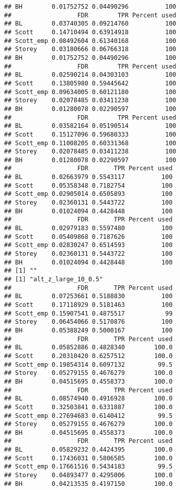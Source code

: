 \documentclass{article}\usepackage[]{graphicx}\usepackage[]{color}
\makeatletter
\newenvironment{kframe}{%
 \def\at@end@of@kframe{}%
 \ifinner\ifhmode%
  \def\at@end@of@kframe{\end{minipage}}%
  \begin{minipage}{\columnwidth}%
 \fi\fi%
 \def\FrameCommand##1{\hskip\@totalleftmargin \hskip-\fboxsep
 \colorbox{shadecolor}{##1}\hskip-\fboxsep
     \hskip-\linewidth \hskip-\@totalleftmargin \hskip\columnwidth}%
 \MakeFramed {\advance\hsize-\width
   \@totalleftmargin\z@ \linewidth\hsize
   \@setminipage}}%
 {\par\unskip\endMakeFramed%
 \at@end@of@kframe}
\newenvironment{knitrout}{}{} %
\makeatother
\begin{document}
\begin{knitrout}
\begin{kframe}
\begin{verbatim}
## BH        0.01752752 0.04490296          100
##                  FDR        TPR Percent used
## BL        0.03740305 0.09214760          100
## Scott     0.14710494 0.63914918          100
## Scott_emp 0.08492604 0.61340168          100
## Storey    0.03180666 0.06766318          100
## BH        0.01752752 0.04490296          100
##                  FDR        TPR Percent used
## BL        0.02590214 0.04303103          100
## Scott     0.13805980 0.59445642          100
## Scott_emp 0.09634005 0.60121180          100
## Storey    0.02078485 0.03411238          100
## BH        0.01280078 0.02290597          100
##                  FDR        TPR Percent used
## BL        0.03582164 0.05190514          100
## Scott     0.15127096 0.59680333          100
## Scott_emp 0.11008205 0.60331368          100
## Storey    0.02078485 0.03411238          100
## BH        0.01280078 0.02290597          100
##                  FDR       TPR Percent used
## BL        0.02663979 0.5543117          100
## Scott     0.05358348 0.7182754          100
## Scott_emp 0.02905014 0.6505893          100
## Storey    0.02360131 0.5443722          100
## BH        0.01024094 0.4428448          100
##                  FDR       TPR Percent used
## BL        0.02979183 0.5597480          100
## Scott     0.05409868 0.7187626          100
## Scott_emp 0.02830247 0.6514593          100
## Storey    0.02360131 0.5443722          100
## BH        0.01024094 0.4428448          100
## [1] ""
## [1] "alt_z_large_10_0.5"
##                  FDR       TPR Percent used
## BL        0.07253661 0.5188830          100
## Scott     0.17118929 0.5181463          100
## Scott_emp 0.15907541 0.4875517           99
## Storey    0.06454066 0.5170876          100
## BH        0.05388249 0.5000167          100
##                  FDR       TPR Percent used
## BL        0.05852886 0.4828340        100.0
## Scott     0.20310420 0.6257512        100.0
## Scott_emp 0.19854314 0.6097132         99.5
## Storey    0.05279155 0.4676279        100.0
## BH        0.04515695 0.4558373        100.0
##                  FDR       TPR Percent used
## BL        0.08574940 0.4916928        100.0
## Scott     0.32503841 0.6331887        100.0
## Scott_emp 0.27694683 0.6140412         99.5
## Storey    0.05279155 0.4676279        100.0
## BH        0.04515695 0.4558373        100.0
##                  FDR       TPR Percent used
## BL        0.05829232 0.4424395        100.0
## Scott     0.17436031 0.5806585        100.0
## Scott_emp 0.17661516 0.5434183         99.5
## Storey    0.04893477 0.4295006        100.0
## BH        0.04213535 0.4197150        100.0

\end{verbatim}
\end{kframe}
\end{knitrout}
\end{document}
